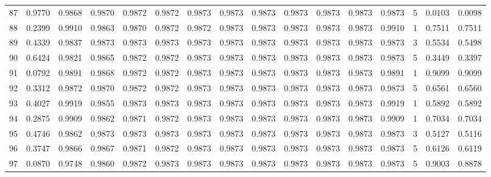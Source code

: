 \begin{tabular}{lrrrrrrrrrrrrrrr}
87  &      0.9770 &  0.9868 &  0.9870 &  0.9872 &  0.9872 &  0.9873 &  0.9873 &  0.9873 &  0.9873 &  0.9873 &   0.9873 &     0.9873 &      5 &                    0.0103 &                     0.0098 \\
88  &      0.2399 &  0.9910 &  0.9863 &  0.9870 &  0.9872 &  0.9872 &  0.9873 &  0.9873 &  0.9873 &  0.9873 &   0.9873 &     0.9910 &      1 &                    0.7511 &                     0.7511 \\
89  &      0.4339 &  0.9837 &  0.9873 &  0.9873 &  0.9873 &  0.9873 &  0.9873 &  0.9873 &  0.9873 &  0.9873 &   0.9873 &     0.9873 &      3 &                    0.5534 &                     0.5498 \\
90  &      0.6424 &  0.9821 &  0.9865 &  0.9872 &  0.9872 &  0.9873 &  0.9873 &  0.9873 &  0.9873 &  0.9873 &   0.9873 &     0.9873 &      5 &                    0.3449 &                     0.3397 \\
91  &      0.0792 &  0.9891 &  0.9868 &  0.9872 &  0.9872 &  0.9873 &  0.9873 &  0.9873 &  0.9873 &  0.9873 &   0.9873 &     0.9891 &      1 &                    0.9099 &                     0.9099 \\
92  &      0.3312 &  0.9872 &  0.9870 &  0.9872 &  0.9872 &  0.9873 &  0.9873 &  0.9873 &  0.9873 &  0.9873 &   0.9873 &     0.9873 &      5 &                    0.6561 &                     0.6560 \\
93  &      0.4027 &  0.9919 &  0.9855 &  0.9873 &  0.9873 &  0.9873 &  0.9873 &  0.9873 &  0.9873 &  0.9873 &   0.9873 &     0.9919 &      1 &                    0.5892 &                     0.5892 \\
94  &      0.2875 &  0.9909 &  0.9862 &  0.9871 &  0.9872 &  0.9873 &  0.9873 &  0.9873 &  0.9873 &  0.9873 &   0.9873 &     0.9909 &      1 &                    0.7034 &                     0.7034 \\
95  &      0.4746 &  0.9862 &  0.9873 &  0.9873 &  0.9873 &  0.9873 &  0.9873 &  0.9873 &  0.9873 &  0.9873 &   0.9873 &     0.9873 &      3 &                    0.5127 &                     0.5116 \\
96  &      0.3747 &  0.9866 &  0.9867 &  0.9871 &  0.9872 &  0.9873 &  0.9873 &  0.9873 &  0.9873 &  0.9873 &   0.9873 &     0.9873 &      5 &                    0.6126 &                     0.6119 \\
97  &      0.0870 &  0.9748 &  0.9860 &  0.9872 &  0.9873 &  0.9873 &  0.9873 &  0.9873 &  0.9873 &  0.9873 &   0.9873 &     0.9873 &      5 &                    0.9003 &                     0.8878 \\

\end{tabular}
